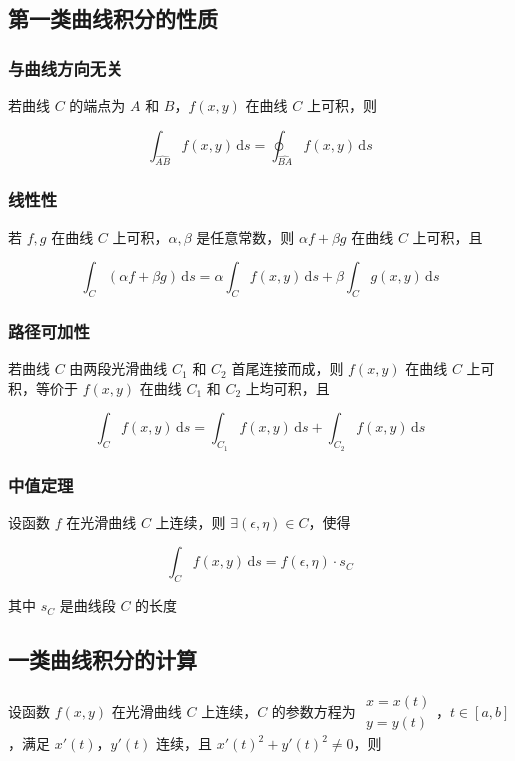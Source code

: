 \documentclass[lang = zh , final , oneside , openany , titlepage , zihao = -4 , linespread = 1.3 , baselineskip = false , cjk-font = windows , text-font = newtx , math-font = newtx , math-style = ISO , uppercase-greek = upright , integral-limits = false]{sjtureport}
\begin{document}
\subsection{第一类曲线积分的性质}

\subsubsection{与曲线方向无关}

若曲线 \(C\) 的端点为 \(A\) 和 \(B\)，\(f(x,y)\) 在曲线 \(C\) 上可积，则

\[\int_{\widehat{AB}} f(x,y)\,\mathrm{d}s=\oint_{\widehat{BA}} f(x,y)\,\mathrm{d}s\]

\subsubsection{线性性}

若 \(f,g\) 在曲线 \(C\) 上可积，\(\alpha , \beta\) 是任意常数，则
\(\alpha f + \beta g\) 在曲线 \(C\) 上可积，且

\[\int_C (\alpha f + \beta g)\,\mathrm{d}s = \alpha \int_C f(x,y)\,\mathrm{d}s + \beta \int_C g(x,y)\,\mathrm{d}s\]

\subsubsection{路径可加性}

若曲线 \(C\) 由两段光滑曲线 \(C_1\) 和 \(C_2\) 首尾连接而成，则
\(f(x,y)\) 在曲线 \(C\) 上可积，等价于 \(f(x,y)\) 在曲线 \(C_1\) 和
\(C_2\) 上均可积，且

\[\int_C f(x,y)\,\mathrm{d}s = \int_{C_1} f(x,y)\,\mathrm{d}s + \int_{C_2} f(x,y)\,\mathrm{d}s\]

\subsubsection{中值定理}

设函数 \(f\) 在光滑曲线 \(C\) 上连续，则
\(\exists (\epsilon,\eta)\in C\)，使得

\[\int_C f(x,y)\,\mathrm{d}s = f(\epsilon,\eta)\cdot s_C\]

其中 \(s_C\) 是曲线段 \(C\) 的长度

\subsection{一类曲线积分的计算}

设函数 \(f(x,y)\) 在光滑曲线 \(C\) 上连续，\(C\) 的参数方程为
\(\begin{aligned}x=x(t)\\y=y(t)\end{aligned}\)，\(t\in [a,b]\)，满足
\(x'(t)\)，\(y'(t)\) 连续，且 \(x'(t)^2 + y'(t)^2 \neq 0\)，则
\end{document}
